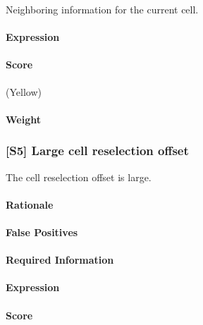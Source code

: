 \documentclass[a4paper,11pt,notitlepage,bigheadings,oneside]{scrartcl}
\begin{document}
Neighboring information for the current cell.

\paragraph{Expression}

\TBD

\paragraph{Score}

\TBD{} (Yellow)

\paragraph{Weight}

\TBD{}


\subsubsection{[S5] Large cell reselection offset}

The cell reselection offset is large.

\paragraph{Rationale}

\TBD

\paragraph{False Positives}

\TBD

\paragraph{Required Information}

\TBD

\paragraph{Expression}

\TBD

\paragraph{Score}
\end{document}
